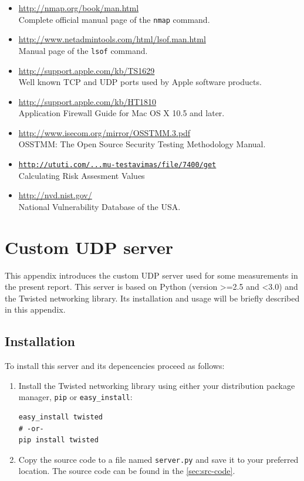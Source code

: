 \documentclass[10pt,a4paper,twoside,onecolumn]{article}
\begin{document}
{}

\begin{itemize}
	\item \url{http://nmap.org/book/man.html}\\Complete official manual page of the \texttt{nmap} command.
	\item \url{http://www.netadmintools.com/html/lsof.man.html}\\Manual page of the \texttt{lsof} command.
	\item \url{http://support.apple.com/kb/TS1629}\\Well known TCP and UDP ports used by Apple software products.
	\item \url{http://support.apple.com/kb/HT1810}\\Application Firewall Guide for Mac OS X 10.5 and later.
	\item \url{http://www.isecom.org/mirror/OSSTMM.3.pdf}\\OSSTMM: The Open Source Security Testing Methodology Manual.
	\item \href{http://ututi.com/subject/vu/mif/programu-sistemu-testavimas/file/7400/get}{\texttt{http://ututi.com/...mu-testavimas/file/7400/get}}\\Calculating Risk Assesment Values
	\item \url{http://nvd.nist.gov/}\\National Vulnerability Database of the USA.
\end{itemize}

\clearpage

\appendix
\section{Custom UDP server}
\label{sec:udp-server}

This appendix introduces the custom UDP server used for some measurements in the present report. This server is based on Python (version >=2.5 and <3.0) and the Twisted networking library. Its installation and usage will be briefly described in this appendix.

\subsection{Installation}

To install this server and its depencencies proceed as follows:

\begin{enumerate}
	\item Install the Twisted networking library using either your distribution package manager, \texttt{pip} or \texttt{easy\_install}:
	\lstset{caption=,label=,language=bash}
\begin{lstlisting}
easy_install twisted
# -or-
pip install twisted
\end{lstlisting}
	\item Copy the source code to a file named \texttt{server.py} and save it to your preferred location. The source code can be found in the \autoref{sec:src-code}.

\end{enumerate}
\end{document}
